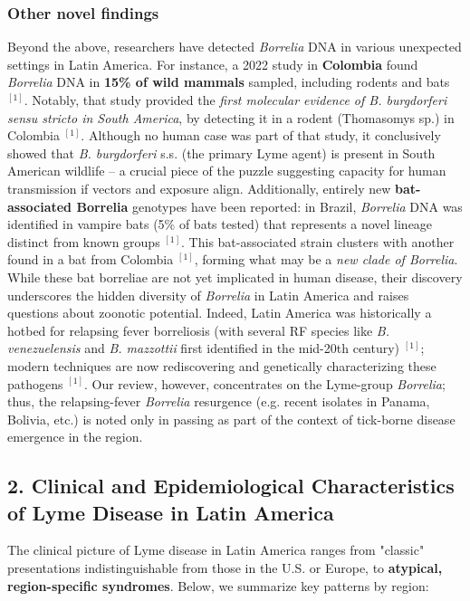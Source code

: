 \documentclass[11pt,letterpaper]{article}
\newcommand{\mycite}[1]{$^{[#1]}$}
\begin{document}
\subsubsection{Other novel findings}
Beyond the above, researchers have detected \textit{Borrelia} DNA in various unexpected settings in Latin America. For instance, a 2022 study in \textbf{Colombia} found \textit{Borrelia} DNA in \textbf{15\% of wild mammals} sampled, including rodents and bats \mycite{1}. Notably, that study provided the \textit{first molecular evidence of \textit{B. burgdorferi sensu stricto} in South America}, by detecting it in a rodent (Thomasomys sp.) in Colombia \mycite{1}. Although no human case was part of that study, it conclusively showed that \textit{B. burgdorferi} s.s. (the primary Lyme agent) is present in South American wildlife – a crucial piece of the puzzle suggesting capacity for human transmission if vectors and exposure align. Additionally, entirely new \textbf{bat-associated Borrelia} genotypes have been reported: in Brazil, \textit{Borrelia} DNA was identified in vampire bats (5\% of bats tested) that represents a novel lineage distinct from known groups \mycite{1}. This bat-associated strain clusters with another found in a bat from Colombia \mycite{1}, forming what may be a \textit{new clade of Borrelia}. While these bat borreliae are not yet implicated in human disease, their discovery underscores the hidden diversity of \textit{Borrelia} in Latin America and raises questions about zoonotic potential. Indeed, Latin America was historically a hotbed for relapsing fever borreliosis (with several RF species like \textit{B. venezuelensis} and \textit{B. mazzottii} first identified in the mid-20th century) \mycite{1}; modern techniques are now rediscovering and genetically characterizing these pathogens \mycite{1}. Our review, however, concentrates on the Lyme-group \textit{Borrelia}; thus, the relapsing-fever \textit{Borrelia} resurgence (e.g. recent isolates in Panama, Bolivia, etc.) is noted only in passing as part of the context of tick-borne disease emergence in the region.

\subsection{2. Clinical and Epidemiological Characteristics of Lyme Disease in Latin America}
The clinical picture of Lyme disease in Latin America ranges from "classic" presentations indistinguishable from those in the U.S. or Europe, to \textbf{atypical, region-specific syndromes}. Below, we summarize key patterns by region:
\end{document}
